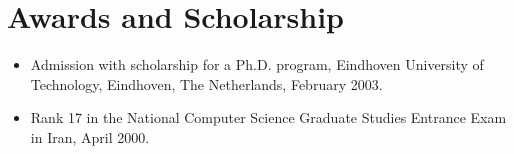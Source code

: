 \section{Awards and Scholarship}

\begin{itemize}

\item Admission with scholarship for a Ph.D. program,
Eindhoven University of Technology, Eindhoven, The Netherlands,
February 2003.

\item Rank 17 in the National Computer Science Graduate Studies
Entrance Exam in Iran, April 2000.
\end{itemize} 